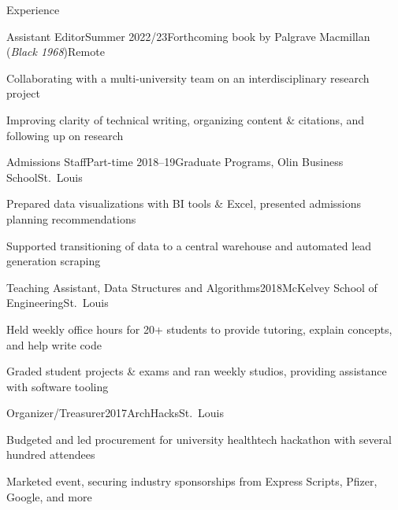   \begin{rSection}{Experience}

    \begin{rSubsection}{Assistant Editor}{Summer 2022/23}{Forthcoming book by Palgrave Macmillan (\emph{Black 1968})}{Remote}
    \item Collaborating with a multi-university team on an interdisciplinary research project %
    \item Improving clarity of technical writing, organizing content \& citations, and following up on research
    \end{rSubsection}

    \begin{rSubsection}{Admissions Staff}{Part-time 2018--19}{Graduate Programs, Olin Business School}{St.\ Louis}
    \item Prepared data visualizations with BI tools \& Excel, presented admissions planning recommendations
    \item Supported transitioning of data to a central warehouse and automated lead generation scraping
    \end{rSubsection}

    \begin{rSubsection}{Teaching Assistant, Data Structures and Algorithms}{2018}{McKelvey School of Engineering}{St.\ Louis}
    \item Held weekly office hours for 20+ students to provide tutoring, explain concepts, and help write code %
    \item Graded student projects \& exams and ran weekly studios, providing assistance with software tooling %
    \end{rSubsection}

    \begin{rSubsection}{Organizer/Treasurer}{2017}{ArchHacks}{St.\ Louis}
    \item Budgeted and led procurement for university healthtech hackathon with several hundred attendees
    \item Marketed event, securing industry sponsorships from Express Scripts, Pfizer, Google, and more
    \end{rSubsection}
  \end{rSection}
